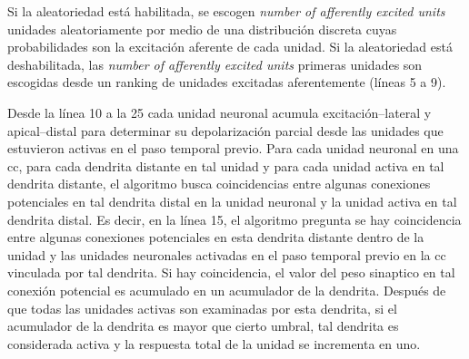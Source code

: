 {\begin{algorithm}
\begin{algorithmic}[1]
				\ENDIF
			\ENDFOR
			\ENDIF
		\ENDFOR
	\ENDFOR

\end{algorithmic}
\end{algorithm}

Si la aleatoriedad está habilitada, se escogen \emph{number of afferently excited units} unidades aleatoriamente por medio de una distribución discreta cuyas probabilidades son la excitación aferente de cada unidad. Si la aleatoriedad está deshabilitada, las \emph{number of afferently excited units} primeras unidades son escogidas desde un ranking de unidades excitadas aferentemente (líneas 5 a 9).

Desde la línea 10 a la 25 cada unidad neuronal acumula excitación--lateral y apical--distal para determinar su depolarización parcial desde las unidades que estuvieron activas en el paso temporal previo. Para cada unidad neuronal en una \gls{cc}, para cada dendrita distante en tal unidad y para cada unidad activa en tal dendrita distante, el algoritmo busca coincidencias entre algunas conexiones potenciales en tal dendrita distal en la unidad neuronal y la unidad activa en tal dendrita distal.
Es decir, en la línea 15, el algoritmo pregunta se hay coincidencia entre algunas conexiones potenciales en esta dendrita distante dentro de la unidad y las unidades neuronales activadas en el paso temporal previo en la \gls{cc} vinculada por tal dendrita.
Si hay coincidencia, el valor del peso sinaptico en tal conexión potencial es acumulado en un acumulador de la dendrita.
Después de que todas las unidades activas son examinadas por esta dendrita, si el acumulador de la dendrita es mayor que cierto umbral, tal dendrita es considerada activa y la respuesta total de la unidad se incrementa en uno.

}
